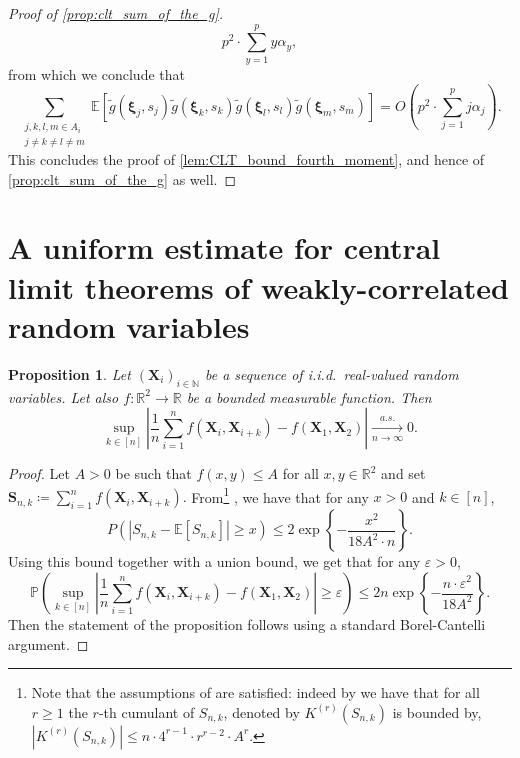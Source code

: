 \documentclass[11pt,a4paper,oneside]{article}
\newtheorem{prop}[thm]{Proposition}
\theoremstyle{definition}
\theoremstyle{remark}
\def\N{\mathbb{N}}
\def\E{\mathbb{E}}
\def\P{\mathbb{P}}
\def\R{\mathbb{R}}
\begin{document}
\begin{proof}[Proof of \cref{prop:clt_sum_of_the_g}]
\begin{equation}
		p^2 \cdot \sum_{y=1}^p y \alpha_{y},
	\end{equation}
	from which we conclude that 
	\begin{equation}
		 \sum_{\substack{j,k, l,m \in A_i\\ j\neq k\neq l \neq m}} \E \left[ \tilde g \left( \bm \xi_j, s_j \right) \tilde g\left( \bm \xi_k, s_k\right) \tilde g \left( \bm \xi_l, s_l\right) \tilde g \left( \bm \xi_m, s_m\right) \right] 
		= 
		O \left( p^2 \cdot \sum_{j=1}^p j \alpha_j \right).
	\end{equation}
	This concludes the proof of \cref{lem:CLT_bound_fourth_moment}, and hence of \cref{prop:clt_sum_of_the_g} as well.
\end{proof}

\appendix

\section{A uniform estimate for central limit theorems of weakly-correlated random variables}

\begin{prop}\label{prop:uniform_bound}
	Let $(\bm X_i)_{i\in\N}$ be a sequence of i.i.d.\ real-valued random variables. Let also $f:\R^2\to\R$ be a bounded measurable function. Then
	$$\sup_{k \in [n]} \left|\frac{1}{n} \sum_{i=1}^{n} f (\bm X_i, \bm X_{i+k})-f(\bm X_1,\bm X_2)  \right| \xrightarrow[n\to\infty]{a.s.} 0.$$
\end{prop}

\begin{proof}
	Let $A>0$ be such that $f(x,y)\leq A$ for all $x,y\in\R^2$ and set $\bm S_{n,k}\coloneqq  \sum_{i=1}^{n} f (\bm X_i, \bm X_{i+k}).$ From\footnote{Note that the assumptions of \cite[Proposition 5]{MR4105789} are satisfied: indeed by \cite[Theorem 5]{MR4105789} we have that for all $r\geq 1$ the $r$-th cumulant of $S_{n,k}$, denoted by $K^{(r)}(S_{n,k})$ is bounded by,
	$|K^{(r)}(S_{n,k})| \leq n \cdot 4^{r-1}\cdot r^{r-2} \cdot A^r .$} \cite[Proposition 5]{MR4105789},  we have that for any $x>0$ and $k\in[n]$,
	\begin{equation}
	P \left(| S_{n,k} - \E [ S_{n,k} ]| \geq x \right) \leq 2 \exp\left\{-\frac{x^2}{18 A^2 \cdot n}\right\}.
	\end{equation}
	Using this bound together with a union bound, we get that for any $\varepsilon>0$,
	\begin{equation}
	\P\left(\sup_{k \in [n]} \left|\frac{1}{n} \sum_{i=1}^{n} f (\bm X_i, \bm X_{i+k})-f(\bm X_1,\bm X_2)  \right|\geq \varepsilon\right)\leq 2n  \exp\left\{-\frac{n\cdot \varepsilon^2}{18 A^2}\right\}.
	\end{equation}
	Then the statement of the proposition follows using a standard Borel-Cantelli argument.
\end{proof}
\end{document}
